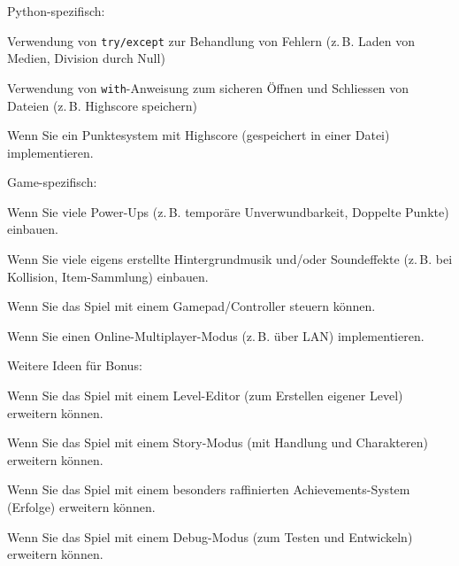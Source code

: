 \begin{todolist}
    \item Python-spezifisch:
    \begin{todolist}
        \item Verwendung von \texttt{try/except} zur Behandlung von Fehlern (z.\,B. Laden von Medien, Division durch Null)
        \item Verwendung von \texttt{with}-Anweisung zum sicheren Öffnen und Schliessen von Dateien (z.\,B. Highscore speichern)
        \item Wenn Sie ein Punktesystem mit Highscore (gespeichert in einer Datei) implementieren.
    \end{todolist}
    \item Game-spezifisch:
    \begin{todolist}
        \item Wenn Sie viele Power-Ups (z.\,B. temporäre Unverwundbarkeit, Doppelte Punkte) einbauen.
        \item Wenn Sie viele eigens erstellte Hintergrundmusik und/oder Soundeffekte (z.\,B. bei Kollision, Item-Sammlung) einbauen.
        \item Wenn Sie das Spiel mit einem Gamepad/Controller steuern können.
        \item Wenn Sie einen Online-Multiplayer-Modus (z.\,B. über LAN) implementieren.
    \end{todolist}
    \item Weitere Ideen für Bonus:
    \begin{todolist}
        \item Wenn Sie das Spiel mit einem Level-Editor (zum Erstellen eigener Level) erweitern können.
        \item Wenn Sie das Spiel mit einem Story-Modus (mit Handlung und Charakteren) erweitern können.
        \item Wenn Sie das Spiel mit einem besonders raffinierten Achievements-System (Erfolge) erweitern können.
        \item Wenn Sie das Spiel mit einem Debug-Modus (zum Testen und Entwickeln) erweitern können.
    \end{todolist}
\end{todolist}

